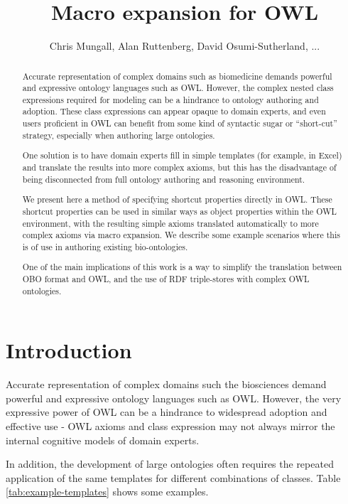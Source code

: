\documentclass[11pt]{article}
\title{Macro expansion for OWL}
\author{Chris Mungall, Alan Ruttenberg, David Osumi-Sutherland, ...}
\begin{document}
\maketitle

\begin{abstract}

Accurate representation of complex domains such as biomedicine demands
powerful and expressive ontology languages such as OWL. However, the
complex nested class expressions required for modeling can be a
hindrance to ontology authoring and adoption. These class expressions
can appear opaque to domain experts, and even users proficient in OWL
can benefit from some kind of syntactic sugar or ``short-cut''
strategy, especially when authoring large ontologies.

One solution is to have domain experts fill in simple templates (for
example, in Excel) and translate the results into more complex axioms,
but this has the disadvantage of being disconnected from full ontology
authoring and reasoning environment.

We present here a method of specifying shortcut properties directly in
OWL. These shortcut properties can be used in similar ways as object
properties within the OWL environment, with the resulting simple
axioms translated automatically to more complex axioms via macro
expansion. We describe some example scenarios where this is of use in
authoring existing bio-ontologies.

One of the main implications of this work is a way to simplify the
translation between OBO format and OWL, and the use of RDF
triple-stores with complex OWL ontologies.

\end{abstract}

\section{Introduction}


Accurate representation of complex domains such the biosciences demand
powerful and expressive ontology languages such as OWL. However, the
very expressive power of OWL can be a hindrance to widespread adoption
and effective use - OWL axioms and class expression may not always
mirror the internal cognitive models of domain experts. 

In addition, the development of large ontologies often requires the
repeated application of the same templates for different combinations
of classes. Table \ref{tab:example-templates} shows some examples.
\end{document}
